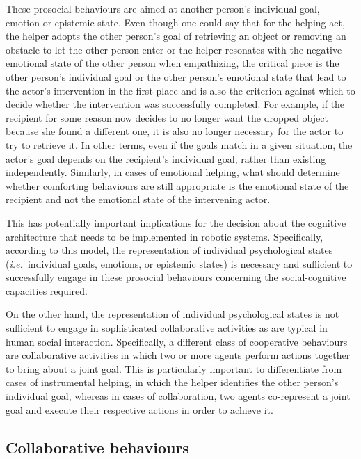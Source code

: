 \documentclass{article}
\newcommand{\ie}{{\textit{i.e.~}}}
\begin{document}
These prosocial behaviours are aimed at another person's individual goal,
emotion or epistemic state. Even though one could say that for the helping act,
the helper adopts the other person's goal of retrieving an object or removing
an obstacle to let the other person enter or the helper resonates with the
negative emotional state of the other person when empathizing, the critical
piece is the other person's individual goal or the other person's emotional
state that lead to the actor's intervention in the first place and is also
the criterion against which to decide whether the intervention was successfully
completed. For example, if the recipient for some reason now decides to no
longer want the dropped object because she found a different one, it is also no
longer necessary for the actor to try to retrieve it. In other terms, even if
the goals match in a given situation, the actor's goal depends on the
recipient's individual goal, rather than existing independently. Similarly,
in cases of emotional helping, what should determine whether comforting
behaviours are still appropriate is the emotional state of the recipient and not
the emotional state of the intervening actor.

This has potentially important implications for the decision about the
cognitive architecture that needs to be implemented in robotic systems.
Specifically, according to this model, the representation of individual
psychological states (\ie individual goals, emotions, or epistemic states) is
necessary and sufficient to successfully engage in these prosocial behaviours
concerning the social-cognitive capacities required. 

On the other hand, the representation of individual psychological states is not
sufficient to engage in sophisticated collaborative activities as are typical
in human social interaction. Specifically, a different class of cooperative
behaviours are collaborative activities in which two or more agents perform
actions together to bring about a joint goal. This is particularly important to
differentiate from cases of instrumental helping, in which the helper
identifies the other person's individual goal, whereas in cases of
collaboration, two agents co-represent a joint goal and execute their
respective actions in order to achieve it. 

\subsection{Collaborative behaviours}
\end{document}
